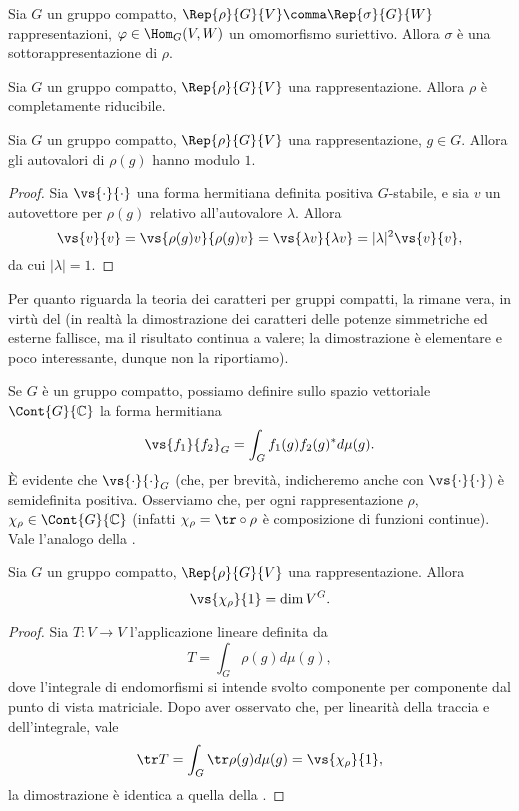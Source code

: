 \begin{corollary}
Sia $G$ un gruppo compatto, $\Rep{\rho}{G}{V}\comma\Rep{\sigma}{G}{W}$ rappresentazioni, $\varphi\in\Hom_G(V,W)$ un omomorfismo suriettivo. Allora $\sigma$ è una sottorappresentazione di $\rho$.
\end{corollary}

\begin{corollary}
Sia $G$ un gruppo compatto, $\Rep{\rho}{G}{V}$ una rappresentazione. Allora $\rho$ è completamente riducibile.
\end{corollary}

\begin{corollary}
Sia $G$ un gruppo compatto, $\Rep{\rho}{G}{V}$ una rappresentazione, $g\in G$. Allora gli autovalori di $\rho(g)$ hanno modulo $1$.
\end{corollary}
\begin{proof}
Sia $\vs{\cdot}{\cdot}$ una forma hermitiana definita positiva $G$-stabile, e sia $v$ un autovettore per $\rho(g)$ relativo all'autovalore $\lambda$. Allora
$$
\vs{v}{v}=\vs{\rho(g)v}{\rho(g)v}=\vs{\lambda v}{\lambda v}=|\lambda|^2\vs{v}{v},
$$
da cui $|\lambda|=1$.
\end{proof}

Per quanto riguarda la teoria dei caratteri per gruppi compatti, la  rimane vera, in virtù del  (in realtà la dimostrazione dei caratteri delle potenze simmetriche ed esterne fallisce, ma il risultato continua a valere; la dimostrazione è elementare e poco interessante, dunque non la riportiamo).

Se $G$ è un gruppo compatto, possiamo definire sullo spazio vettoriale $\Cont{G}{\mathbb{C}}$ la forma hermitiana
$$
\vs{f_1}{f_2}_G=\int_Gf_1(g)f_2(g)^*d\mu(g).
$$
È evidente che $\vs{\cdot}{\cdot}_G$ (che, per brevità, indicheremo anche con $\vs{\cdot}{\cdot}$) è semidefinita positiva. Osserviamo che, per ogni rappresentazione $\rho$, $\chi_\rho\in\Cont{G}{\mathbb{C}}$ (infatti $\chi_\rho=\tr\circ\rho$ è composizione di funzioni continue). Vale l'analogo della .
\begin{proposition}
Sia $G$ un gruppo compatto, $\Rep{\rho}{G}{V}$ una rappresentazione. Allora
$$
\vs{\chi_\rho}{1}=\dim V^G.
$$
\end{proposition}
\begin{proof}
Sia $T:V\to V$ l'applicazione lineare definita da
$$
T=\int_G\rho(g)d\mu(g),
$$
dove l'integrale di endomorfismi si intende svolto componente per componente dal punto di vista matriciale. Dopo aver osservato che, per linearità della traccia e dell'integrale, vale
$$
\tr T=\int_G\tr\rho(g)d\mu(g)=\vs{\chi_\rho}{1},
$$
la dimostrazione è identica a quella della .
\end{proof}

